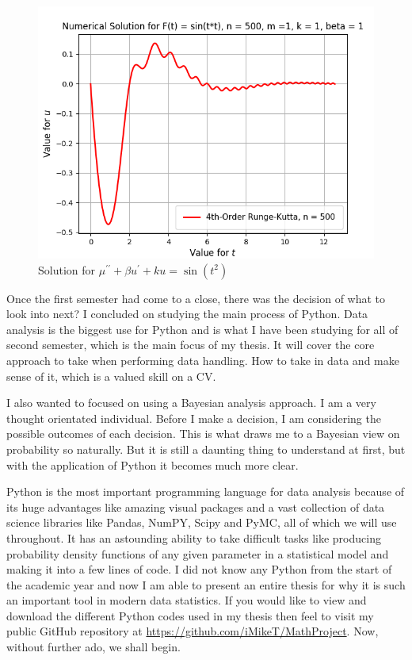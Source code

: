 \documentclass[12pt,twoside]{report}   %
\begin{document}
\begin{figure}[H]
\centering
\includegraphics[width = 5in]{Kuttaadv.png}
\caption{Solution for $\mu^{\prime\prime} + \beta u^{\prime} + ku = \sin(t^2)$}
\label{figKuttaadv}
\end{figure}

\pagebreak
Once the first semester had come to a close, there was the decision of what to look into next? I concluded on studying the main process of Python. Data analysis is the biggest use for Python and is what I have been studying for all of second semester, which is the main focus of my thesis. It will cover the core approach to take when performing data handling. How to take in data and make sense of it, which is a valued skill on a CV.

I also wanted to focused on using a Bayesian analysis approach. I am a very thought orientated individual. Before I make a decision, I am considering the possible outcomes of each decision. This is what draws me to a Bayesian view on probability so naturally. But it is still a daunting thing to understand at first, but with the application of Python it becomes much more clear.

Python is the most important programming language for data analysis because of its huge advantages like amazing visual packages and a vast collection of data science libraries like Pandas, NumPY, Scipy and PyMC, all of which we will use throughout. It has an astounding ability to take difficult tasks like producing probability density functions of any given parameter in a statistical model and making it into a few lines of code. I did not know any Python from the start of the academic year and now I am able to present an entire thesis for why it is such an important tool in modern data statistics. If you would like to view and download the different Python codes used in my thesis then feel to visit my public GitHub repository at \url{https://github.com/iMikeT/MathProject}. Now, without further ado, we shall begin.
\end{document}
